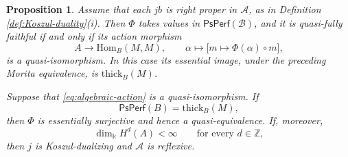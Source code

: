 \documentclass[11pt,letterpaper,reqno]{amsart}
\theoremstyle{plain}
\newtheorem{proposition}[proposition]{Proposition}
\theoremstyle{definition}
\theoremstyle{plain}
\theoremstyle{definition}
\numberwithin{equation}{section}
\begin{document}
\begin{proposition}\label{prop:algebraic-comparison}
Assume that each $jb$ is right proper in $\mathscr A$, as in Definition \ref{def:Koszul-duality}(i).
Then $\Phi$ takes values in $\mathsf{PsPerf}(\mathscr B)$, and it is quasi-fully faithful if and only if its action morphism
\begin{equation}\label{eq:algebraic-action}
A\longrightarrow\mathrm{Hom}_B(M,M),\qquad
\alpha\longmapsto\bigl[m\longmapsto\Phi(\alpha)\circ m\bigr],
\end{equation}
is a quasi-isomorphism.
In this case its essential image, under the preceding Morita equivalence, is $\mathrm{thick}_B(M)$.

Suppose that \eqref{eq:algebraic-action} is a quasi-isomorphism.
If
\begin{equation}\label{eq:algebraic-density-test}
\mathsf{PsPerf}(B)=\mathrm{thick}_B(M),
\end{equation}
then $\Phi$ is essentially surjective and hence a quasi-equivalence.
If, moreover,
\begin{equation}\label{eq:algebraic-degreewise-finiteness}
\dim_{\Bbbk}H^d(A)<\infty
\qquad\text{for every }d\in\mathbb Z,
\end{equation}
then $j$ is Koszul-dualizing and $\mathscr A$ is reflexive.
\end{proposition}
\end{document}
